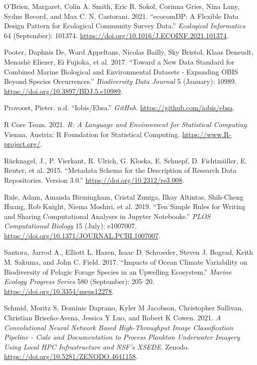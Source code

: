 \documentclass[
]{book}
\newlength{\cslhangindent}
\newlength{\cslentryspacingunit} %
\newenvironment{CSLReferences}[2] %
 {%
  \setlength{\parindent}{0pt}
  \ifodd #1
  \let\oldpar\par
  \def\par{\hangindent=\cslhangindent\oldpar}
  \fi
  \setlength{\parskip}{#2\cslentryspacingunit}
 }%
 {}
\begin{document}
\begin{CSLReferences}{1}{0}
\leavevmode{}%
O'Brien, Margaret, Colin A. Smith, Eric R. Sokol, Corinna Gries, Nina Lany, Sydne Record, and Max C. N. Castorani. 2021. {``ecocomDP: A Flexible Data Design Pattern for Ecological Community Survey Data.''} \emph{Ecological Informatics} 64 (September): 101374. \url{https://doi.org/10.1016/J.ECOINF.2021.101374}.

\leavevmode{}%
Pooter, Daphnis De, Ward Appeltans, Nicolas Bailly, Sky Bristol, Klaas Deneudt, Menashè Eliezer, Ei Fujioka, et al. 2017. {``Toward a New Data Standard for Combined Marine Biological and Environmental Datasets - Expanding OBIS Beyond Species Occurrences.''} \emph{Biodiversity Data Journal} 5 (January): 10989. \url{https://doi.org/10.3897/BDJ.5.e10989}.

\leavevmode{}%
Provoost, Pieter. n.d. {``Iobis/Ebsa.''} \emph{GitHub}. \url{https://github.com/iobis/ebsa}.

\leavevmode{}%
R Core Team. 2021. \emph{R: A Language and Environment for Statistical Computing}. Vienna, Austria: R Foundation for Statistical Computing. \url{https://www.R-project.org/}.

\leavevmode{}%
Rücknagel, J., P. Vierkant, R. Ulrich, G. Kloska, E. Schnepf, D. Fichtmüller, E. Reuter, et al. 2015. {``Metadata Schema for the Description of Research Data Repositories. Version 3.0.''} \url{https://doi.org/10.2312/re3.008}.

\leavevmode{}%
Rule, Adam, Amanda Birmingham, Cristal Zuniga, Ilkay Altintas, Shih-Cheng Huang, Rob Knight, Niema Moshiri, et al. 2019. {``Ten Simple Rules for Writing and Sharing Computational Analyses in Jupyter Notebooks.''} \emph{PLOS Computational Biology} 15 (July): e1007007. \url{https://doi.org/10.1371/JOURNAL.PCBI.1007007}.

\leavevmode{}%
Santora, Jarrod A., Elliott L. Hazen, Isaac D. Schroeder, Steven J. Bograd, Keith M. Sakuma, and John C. Field. 2017. {``Impacts of Ocean Climate Variability on Biodiversity of Pelagic Forage Species in an Upwelling Ecosystem.''} \emph{Marine Ecology Progress Series} 580 (September): 205--20. \url{https://doi.org/10.3354/meps12278}.

\leavevmode{}%
Schmid, Moritz S, Dominic Daprano, Kyler M Jacobson, Christopher Sullivan, Christian Briseño-Avena, Jessica Y Luo, and Robert K Cowen. 2021. \emph{A Convolutional Neural Network Based High-Throughput Image Classification Pipeline - Code and Documentation to Process Plankton Underwater Imagery Using Local HPC Infrastructure and NSF's XSEDE}. Zenodo. \url{https://doi.org/10.5281/ZENODO.4641158}.


\end{CSLReferences}
\end{document}
